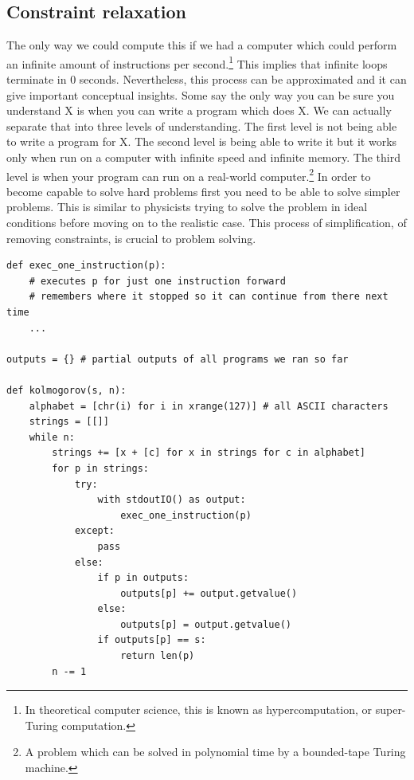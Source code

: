 \newpage

\subsection{Constraint relaxation}

The only way we could compute this if we had a computer which could perform an infinite amount of instructions per second.\footnote{In theoretical computer science, this is known as hypercomputation, or super-Turing computation.}
This implies that infinite loops terminate in 0 seconds.
Nevertheless, this process can be approximated and it can give important conceptual insights.
Some say the only way you can be sure you understand X is when you can write a program which does X.
We can actually separate that into three levels of understanding.
The first level is not being able to write a program for X.
The second level is being able to write it but it works only when run on a computer with infinite speed and infinite memory.
The third level is when your program can run on a real-world computer.\footnote{A problem which can be solved in polynomial time by a bounded-tape Turing machine.}
In order to become capable to solve hard problems first you need to be able to solve simpler problems.
This is similar to physicists trying to solve the problem in ideal conditions before moving on to the realistic case.
This process of simplification, of removing constraints, is crucial to problem solving.

\newpage

\begin{lstlisting}[caption={Approximating Kolmogorov complexity by limiting the number of instructions $n$ the programs are being executed, as well as the number of different programs which are being executed. As you run this for larger and larger $n$, the return value becomes smaller and smaller, until you reach $K(s)$ and the return value remains $K(s)$ from then on. We say that $K(x)$ is computable in the limit from above. If we were to modify this program so as to put a hard limit on the maximum program length, we could approximate the lower bound of $K(x)$.}]
def exec_one_instruction(p):
	# executes p for just one instruction forward 
	# remembers where it stopped so it can continue from there next time
	...

outputs = {} # partial outputs of all programs we ran so far

def kolmogorov(s, n):
	alphabet = [chr(i) for i in xrange(127)] # all ASCII characters
	strings = [[]]
	while n:
		strings += [x + [c] for x in strings for c in alphabet]
		for p in strings:
			try:
				with stdoutIO() as output:
					exec_one_instruction(p)
			except:
				pass
			else:
				if p in outputs:
					outputs[p] += output.getvalue()
				else:
					outputs[p] = output.getvalue()
				if outputs[p] == s:
					return len(p)
		n -= 1
\end{lstlisting}

